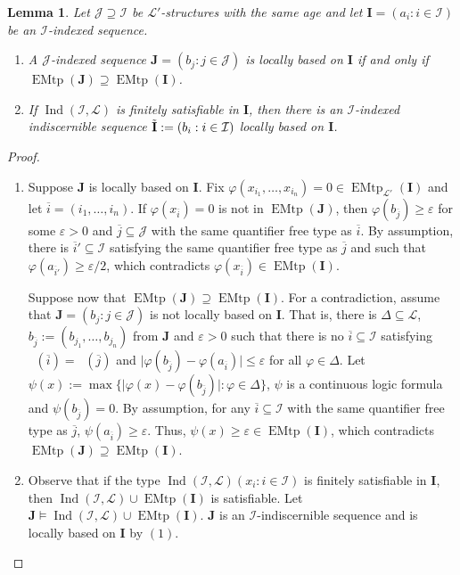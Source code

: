 \documentclass{amsart}
\newtheorem{lema}[teor]{Lemma}
\newtheorem{external claim}[teor]{Claim}
\newcommand{\mL}{\mathcal{L}}
\newcommand{\I}{\mathcal{I}}
\newcommand{\II}{\mathbf{I}}
\DeclareMathOperator{\qftp}{{tp^{qf}}}
\DeclareMathOperator{\emtp}{{EMtp}}
\DeclareMathOperator{\Ind}{{Ind}}
\begin{document}
\begin{lema}%
\label{EMTP, based on and Ind(I,L)}
Let $\mathcal{J} \supseteq \I$ be $\mL'$-structures with the same age and let $\II=(a_i:i\in \I)$ be an $\I$-indexed sequence. 
\begin{enumerate}
    \item  A $\mathcal{J}$-indexed sequence $\mathbf{J}=(b_j:j\in \mathcal{J})$ is locally based on $\II$ if and only if $\emtp(\mathbf{J})\supseteq \emtp(\II)$.
    \item If $\Ind(\I,\mL)$ is finitely satisfiable in $\II$, then there is an $\I$-indexed indiscernible sequence $\Tilde{\II}:=(b_i:i\in \mathcal{I})$ locally based on $\II$.
\end{enumerate}
\end{lema}
\begin{proof}
    \begin{enumerate}
        \item Suppose $\mathbf{J}$ is locally based on $\II$. Fix $\varphi(x_{i_1},\dots,x_{i_n})=0\in \emtp_{\mL'}(\II)$ and let $\overline{i}=(i_1,\dots,i_n)$. If $ \varphi(x_{\overline{i}})=0$ is not in $\emtp(\mathbf{J})$, then $\varphi(b_{\overline{j}})\geq \varepsilon$ for some $\varepsilon>0$ and $\overline{j}\subseteq \mathcal{J}$ with the same quantifier free type as $\overline{i}$. By assumption, there is $\overline{i}'\subseteq \I$ satisfying the same quantifier free type as $\overline{j}$ and such that $\varphi(a_{\overline{i}'})\geq \varepsilon/2$, which contradicts $\varphi(x_{\overline{i}})\in \emtp(\II)$.

        Suppose now that $\emtp(\mathbf{J})\supseteq \emtp(\II)$. For a contradiction, assume that $\mathbf{J}=(b_j:j\in \mathcal{J})$ is not locally based on $\II$. That is, there is $\Delta \subseteq \mL$, $b_{\overline{j}}:=(b_{j_1},\dots,b_{j_n})$ from $\mathbf{J}$ and $\varepsilon>0$ such that there is no $\overline{i}\subseteq \I$ satisfying $\qftp(\overline{i})=\qftp(\overline{j})$ and $\lvert \varphi(b_{\overline{j}})- \varphi(a_{\overline{i}}) \rvert\leq \varepsilon$ for all $\varphi\in \Delta$. Let $\psi(x):=\max \{ \lvert  \varphi(x) - \varphi(b_{\overline{j}})\rvert : \varphi\in \Delta \}$, $\psi$ is a continuous logic formula and $\psi(b_{\overline{j}})=0$. By assumption, for any $\overline{i}\subseteq \I$ with the same quantifier free type as $\overline{j}$, $\psi(a_{\overline{i}})\geq \varepsilon$. Thus, $\psi(x)\geq \varepsilon \in \emtp(\II)$, which contradicts $\emtp(\mathbf{J})\supseteq \emtp(\II)$.
    
    \item Observe that if the type  $\Ind(\I,\mL)(x_i: i\in \I)$ %
    is finitely satisfiable in $\II$, then %
    $\Ind(\I,\mL) \cup \emtp(\II)$ is satisfiable. Let $\mathbf{J}\models \Ind(\I,\mL)\cup \emtp(\II)$. $\mathbf{J}$ is an $\I$-indiscernible sequence and is locally based on $\II$ by $(1)$.
    \end{enumerate}    
\end{proof}
\end{document}
